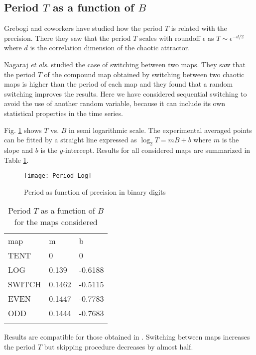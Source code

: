 \subsection{Period $T$ as a function of $B$}

Grebogi and coworkers \cite{Grebogi1988} have studied how the period $T$ is related with the precision.
There they saw that the period $T$ scales with roundoff $\epsilon$ as $T\sim\epsilon^{-d/2}$ where $d$ is the correlation dimension of the chaotic attractor.

Nagaraj \textit{et als}. \cite{Nagaraj2008} studied the case of switching between two maps.
They saw that the period $T$ of the compound map obtained by switching between two chaotic maps is higher than the period of each map and they found that a random switching improves the results.
Here we have considered sequential switching to avoid the use of another random variable, because it can include its own statistical properties in the time series.

Fig. \ref{fig:period} shows  $T$ vs. $B$ in semi logarithmic scale.
The experimental averaged points can be fitted by a straight line expressed as $\log_2 T=m B + b$ where $m$ is the slope and $b$ is the $y$-intercept.
Results for all considered maps are summarized in Table \ref{tabla:periodos}.

\begin{figure}[htpb]
\centering	
	\texttt{[image: Period\_Log]}
	\caption{Period as function of precision in binary digits} \label{fig:period}
\end{figure}

\begin{table}[htpb]
\centering	
	\caption{Period $T$ as a function of $B$ for the maps considered}
	\vspace{1em}
	\begin{tabular}{lll}
		\hline\noalign{\smallskip}
		map & m & b  \\
		\noalign{\smallskip}\hline\noalign{\smallskip}
		TENT&0 & 0 \\
		LOG &0.139 & -0.6188 \\
		SWITCH &0.1462 & -0.5115 \\
		EVEN &0.1447 & -0.7783 \\
		ODD &0.1444 & -0.7683 \\
		\noalign{\smallskip}\hline
	\end{tabular}
	\label{tabla:periodos}	
\end{table}

Results are compatible for those obtained in \cite{Nagaraj2008}.
Switching between maps increases the period $T$ but skipping procedure decreases by almost half.